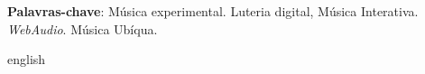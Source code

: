 \documentclass[
	12pt,				%
	openright,			%
	twoside,			%
	a4paper,			%
	english,			%
	french,				%
	spanish,			%
	brazil				%
	]{abntex2}
\begin{document}
\setlength{\absparsep}{18pt} %
\begin{resumo}




 \textbf{Palavras-chave}: Música experimental. Luteria digital, Música Interativa. \textit{WebAudio}. Música Ubíqua. 
\end{resumo}

\begin{resumo}[Abstract]
\begin{otherlanguage*}{english}


   \vspace{\onelineskip}
 
   \noindent 
 \end{otherlanguage*}
\end{resumo}
\end{document}
